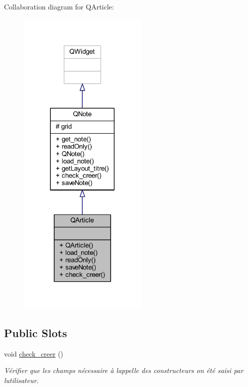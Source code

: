 Collaboration diagram for Q\+Article\+:\nopagebreak
\begin{figure}[H]
\begin{center}
\leavevmode
\includegraphics[width=176pt]{class_q_article__coll__graph}
\end{center}
\end{figure}
\subsection*{Public Slots}
\begin{DoxyCompactItemize}
\item 
\mbox{\label{class_q_article_a1d1a9f629113e6135bce19a9c84b03e9}} 
void \hyperlink{class_q_article_a1d1a9f629113e6135bce19a9c84b03e9}{check\+\_\+creer} ()
\begin{DoxyCompactList}\small\item\em Vérifier que les champs nécessaire à l\textquotesingle{}appelle des constructeurs on été saisi par l\textquotesingle{}utilisateur. \end{DoxyCompactList}\end{DoxyCompactItemize}
